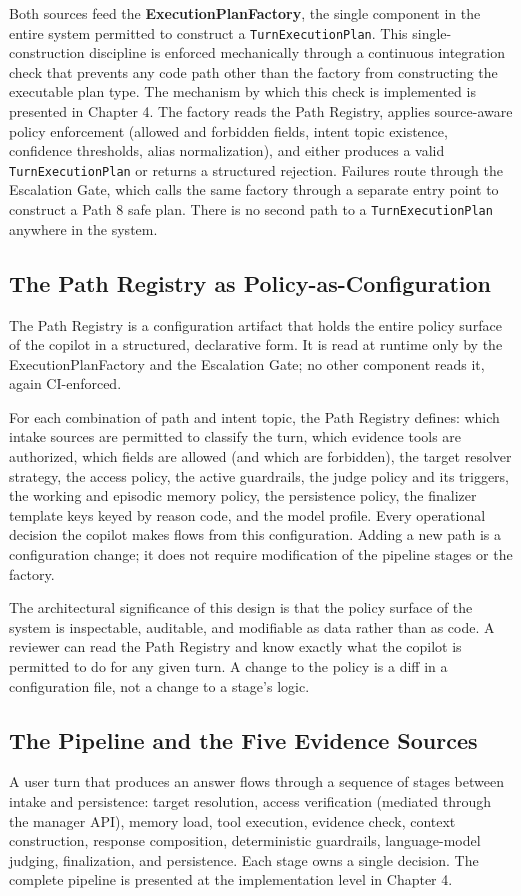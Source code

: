 Both sources feed the \textbf{ExecutionPlanFactory}, the single component in the entire system permitted to construct a \texttt{TurnExecutionPlan}. This single-construction discipline is enforced mechanically through a continuous integration check that prevents any code path other than the factory from constructing the executable plan type. The mechanism by which this check is implemented is presented in Chapter 4. The factory reads the Path Registry, applies source-aware policy enforcement (allowed and forbidden fields, intent topic existence, confidence thresholds, alias normalization), and either produces a valid \texttt{TurnExecutionPlan} or returns a structured rejection. Failures route through the Escalation Gate, which calls the same factory through a separate entry point to construct a Path 8 safe plan. There is no second path to a \texttt{TurnExecutionPlan} anywhere in the system.

\subsection*{The Path Registry as Policy-as-Configuration}
The Path Registry is a configuration artifact that holds the entire policy surface of the copilot in a structured, declarative form. It is read at runtime only by the ExecutionPlanFactory and the Escalation Gate; no other component reads it, again CI-enforced.

For each combination of path and intent topic, the Path Registry defines: which intake sources are permitted to classify the turn, which evidence tools are authorized, which fields are allowed (and which are forbidden), the target resolver strategy, the access policy, the active guardrails, the judge policy and its triggers, the working and episodic memory policy, the persistence policy, the finalizer template keys keyed by reason code, and the model profile. Every operational decision the copilot makes flows from this configuration. Adding a new path is a configuration change; it does not require modification of the pipeline stages or the factory.

The architectural significance of this design is that the policy surface of the system is inspectable, auditable, and modifiable as data rather than as code. A reviewer can read the Path Registry and know exactly what the copilot is permitted to do for any given turn. A change to the policy is a diff in a configuration file, not a change to a stage's logic.

\subsection*{The Pipeline and the Five Evidence Sources}
A user turn that produces an answer flows through a sequence of stages between intake and persistence: target resolution, access verification (mediated through the manager API), memory load, tool execution, evidence check, context construction, response composition, deterministic guardrails, language-model judging, finalization, and persistence. Each stage owns a single decision. The complete pipeline is presented at the implementation level in Chapter 4.

